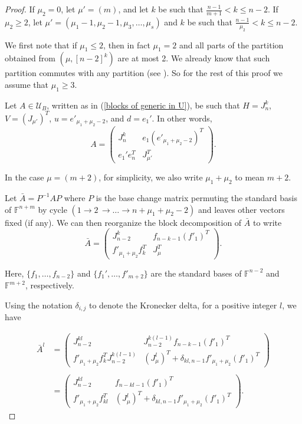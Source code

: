 \documentclass[11pt]{amsproc}
\newcommand{\U}{\mathcal{U}}
\begin{document}
\begin{proof}
If $\mu_2=0$, let $\mu'=(m)$, and let $k$ be such that $\frac{n-1}{m+1}< k \leq n-2$. If $\mu_2\geq 2$, let $\mu'=(\mu_1-1, \mu_2-1, \mu_3, \ldots, \mu_s)$ and  $k$ be such that $\frac{n-1}{\mu_2}< k \leq n-2$.

We first note that if $\mu_1\leq 2$, then in fact $\mu_1=2$ and all parts of the partition obtained from $\left(\mu, [n-2]^k\right)$ are at most 2. We already know that such partition commutes with any partition (see \cite[Thm. 2.4]{Obl-3}). So for the rest of this proof we assume that $\mu_1\geq 3$. 

Let $A\in \U_B$, written as in (\ref{blocks of generic in U}), be such that  $H=J_n^k$, $V=\left(J_{\mu'}\right)^T$, $u=e'_{\mu_1+\mu_2-2}$, and $d=e_1'$. 
In other words, 
 \[A=\left( 
\begin{array}{c|c}
  J_n^k  & e_1\left(e'_{\mu_1+\mu_2-2}\right)^T \\
  \hline
  e_1'e_n^T   & J_{\mu'}^T
\end{array}
\right).\]

In the case $\mu=(m+2)$, for simplicity, we also write $\mu_1+\mu_2$ to mean $m+2$. 

Let $\bar{A}=P^{-1}AP$ where $P$ is the base change matrix permuting the standard basis of $\mathbb{F}^{n+m}$ by cycle  $(1\to 2\, \to \ldots \to n+\mu_1+\mu_2-2)$ and leaves other vectors fixed (if any). We can then reorganize the block decomposition of $\bar{A}$ to write 
\[\bar{A}= 
\left( 
\begin{array}{c|c}
  J_{n-2}^k & f_{n-k-1}\left(f'_1\right)^T \\
 \hline
  f'_{\mu_1+\mu_2}f_k^T & J_\mu^T
\end{array}
\right).\]

Here, $\{f_1, \ldots, f_{n-2}\}$ and $\{f_1', \ldots,f'_{m+2}\}$ are the standard bases of $\mathbb{F}^{n-2}$ and $\mathbb{F}^{m+2}$, respectively. 

Using the notation $\delta_{i,j}$ to denote the Kronecker delta, for a positive integer $l$, we have 

\[\begin{array}{ll}
\bar{A}^l&= 
\left( 
\begin{array}{c|c}
  J_{n-2}^{kl} & J_{n-2}^{k(l-1)}f_{n-k-1}\left(f'_1\right)^T \\
 \hline
  f'_{\mu_1+\mu_2}f_k^TJ_{n-2}^{k(l-1)}& \left(J^l_\mu\right)^T +\delta_{kl,n-1}f'_{\mu_1+\mu_2}(f'_1)^T
\end{array}
\right)
\\ \\
&=
\left( 
\begin{array}{c|c}
  J_{n-2}^{kl} &f_{n-kl-1}\left(f'_1\right)^T \\
 \hline
  f'_{\mu_1+\mu_2}f_{kl}^T& \left(J^l_\mu\right)^T +\delta_{kl,n-1}f'_{\mu_1+\mu_2}(f'_1)^T
\end{array}
\right).
\end{array}\]


\end{proof}
\end{document}
